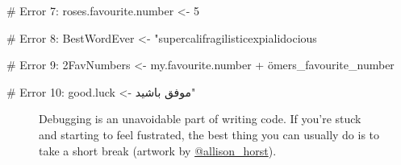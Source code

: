 \documentclass[
  letterpaper,
  DIV=11,
  numbers=noendperiod,
  oneside]{scrreprt}
\newenvironment{Shaded}{\begin{snugshade}}{\end{snugshade}}
\newcommand{\CommentTok}[1]{\textcolor[rgb]{0.37,0.37,0.37}{#1}}
\newcommand{\NormalTok}[1]{\textcolor[rgb]{0.00,0.23,0.31}{#1}}
\newcommand{\StringTok}[1]{\textcolor[rgb]{0.13,0.47,0.30}{#1}}
\begin{document}
\begin{tcolorbox}
\begin{Shaded}
\begin{Highlighting}[]
\CommentTok{\# Error 7:}
\NormalTok{rose}\StringTok{\textquotesingle{}s.favourite.number \textless{}{-} 5}

\StringTok{\# Error 8:}
\StringTok{BestWordEver \textless{}{-} "supercalifragilisticexpialidocious}

\StringTok{\# Error 9:}
\StringTok{2FavNumbers \textless{}{-} my.favourite.number + ömers\_favourite\_number}

\StringTok{\# Error 10:}
\StringTok{good.luck \textless{}{-} موفق باشيد"}
\end{Highlighting}
\end{Shaded}

\end{tcolorbox}

\begin{figure}


\caption{\label{fig-ErrorMonster}Debugging is an unavoidable part of
writing code. If you're stuck and starting to feel fustrated, the best
thing you can usually do is to take a short break (artwork by
\href{https://allisonhorst.com/allison-horst}{@allison\_horst}).}

\end{figure}%
\end{document}
